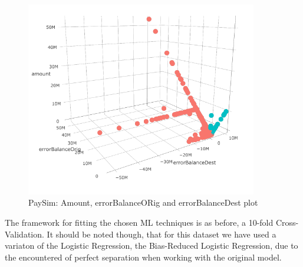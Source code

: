 \documentclass[12pt,]{article}
\begin{document}
\begin{figure}
\centering
\includegraphics[width=0.9\textwidth,height=\textheight]{figures/paySim/descriptive/threedimensionalplot.png}
\caption{PaySim: Amount, errorBalanceORig and errorBalanceDest plot}
\end{figure}

The framework for fitting the chosen ML techniques is as before, a
10-fold Cross-Validation. It should be noted though, that for this
dataset we have used a variaton of the Logistic Regression, the
Bias-Reduced Logistic Regression, due to the encountered of perfect
separation when working with the original model.

\begin{table}

\caption{\label{tab:paySim_models_AUC}PaySim: AUC Metric Model Variations}
\centering
{}
\end{table}
\end{document}
